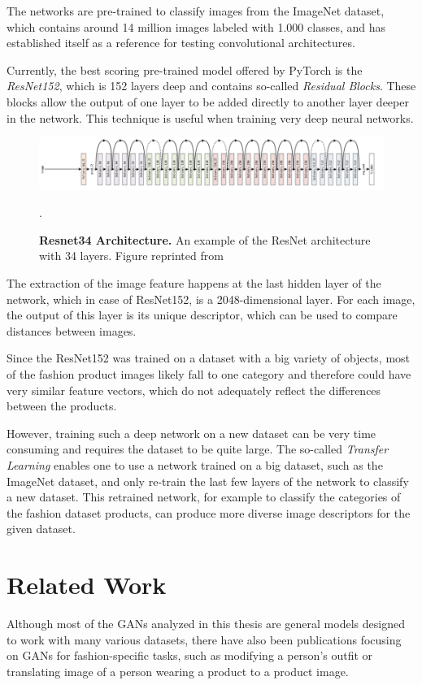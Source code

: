 \documentclass[12pt]{report}
\begin{document}
The networks are pre-trained to classify images from the ImageNet dataset, which contains around 14 million images labeled with 1.000 classes, and has established itself as a reference for testing convolutional architectures. 

Currently, the best scoring pre-trained model offered by PyTorch is the \textit{ResNet152}, which is 152 layers deep and contains so-called \textit{Residual Blocks}. These blocks allow the output of one layer to be added directly to another layer deeper in the network. This technique is useful when training very deep neural networks.

\begin{figure}[h]
\centering
{\includegraphics[width=\linewidth]{02_background/CBIR/resnet_arch}}
\caption{\label{fig:resnet34} \textbf{Resnet34 Architecture.} An example of the ResNet architecture with 34 layers. Figure reprinted from \cite{noauthor_resnet-152_nodate}}.
\end{figure}

The extraction of the image feature happens at the last hidden layer of the network, which in case of ResNet152, is a 2048-dimensional layer. For each image, the output of this layer is its unique descriptor, which can be used to compare distances between images.

Since the ResNet152 was trained on a dataset with a big variety of objects, most of the fashion product images likely fall to one category and therefore could have very similar feature vectors, which do not adequately reflect the differences between the products.

However, training such a deep network on a new dataset can be very time consuming and requires the dataset to be quite large. The so-called \textit{Transfer Learning} enables one to use a network trained on a big dataset, such as the ImageNet dataset, and only re-train the last few layers of the network to classify a new dataset. This retrained network, for example to classify the categories of the fashion dataset products, can produce more diverse image descriptors for the given dataset.

\pagebreak
\section{Related Work}
Although most of the GANs analyzed in this thesis are general models designed to work with many various datasets, there have also been publications focusing on GANs for fashion-specific tasks, such as modifying a person's outfit or translating image of a person wearing a product to a product image.
\end{document}
